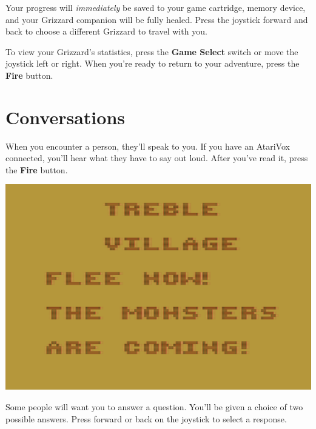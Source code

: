 \documentclass[10pt,twocolumn,openany,article]{memoir}
\begin{document}
\ifdefined\NOSAVE\else Your progress will \emph{immediately} be saved to
your \ifdefined\ATARIAGESAVE  game cartridge,  \else memory  device, \fi
\fi   and    your   Grizzard    companion   will   be    fully   healed.
\ifdefined\NOSAVE\else  Press the  joystick forward  and back  to choose
a different Grizzard to travel with you. \fi

To  view  your Grizzard's  statistics,  press  the \textbf{Game  Select}
switch or move  the joystick left or right. When  you're ready to return
to your adventure, press the \textbf{Fire} button.

\section{Conversations}

When  you encounter  a person,  they'll  speak to  you. If  you have  an
AtariVox  connected,  you'll  hear  what  they have  to  say  out  loud.
After you've read it, press the \textbf{Fire} button.

\begin{center}
  \includegraphics[width=\columnwidth]{../Manual/TextNTSC.png}
\end{center}

Some people will want you to answer a question. You'll be given a choice
of two possible answers. Press forward or back on the joystick to select
a response.
\end{document}
